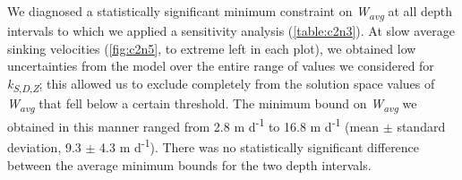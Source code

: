 We diagnosed a statistically significant minimum constraint on \emph{W\textsubscript{avg}} at all depth intervals to which we applied a sensitivity analysis (\autoref{table:c2n3}). At slow average sinking velocities (\autoref{fig:c2n5}, to extreme left in each plot), we obtained low uncertainties from the model over the entire range of values we considered for \emph{k\textsubscript{S}}\textsubscript{,\emph{D},\emph{Z}}; this allowed us to exclude completely from the solution space values of \emph{W\textsubscript{avg}} that fell below a certain threshold. The minimum bound on \emph{W\textsubscript{avg}} we obtained in this manner ranged from 2.8 m d\textsuperscript{-1} to 16.8 m d\textsuperscript{-1} (mean $\pm$ standard deviation, 9.3 $\pm$ 4.3 m d\textsuperscript{-1}). There was no statistically significant difference between the average minimum bounds for the two depth intervals.

